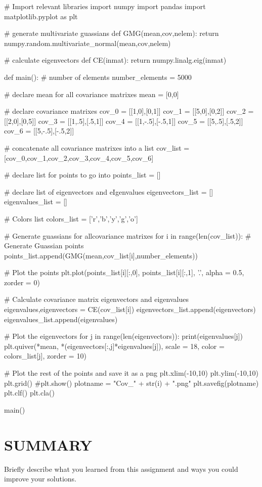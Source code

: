 \documentclass{article}
\begin{document}
\begin{python}
        # Import relevant libraries
        import numpy
        import pandas
        import matplotlib.pyplot as plt

        # generate multivariate guassians
        def GMG(mean,cov,nelem):
            return numpy.random.multivariate_normal(mean,cov,nelem)
        
        # calculate eigenvectors
        def CE(inmat):
            return numpy.linalg.eig(inmat)
        
        def main():
            # number of elements
            number_elements = 5000
        
           # declare mean for all covariance matrixes
            mean = [0,0]
        
            # declare covariance matrixes
            cov_0 = [[1,0],[0,1]]
            cov_1 = [[5,0],[0,2]]
            cov_2 = [[2,0],[0,5]]
            cov_3 = [[1,.5],[.5,1]]
            cov_4 = [[1,-.5],[-.5,1]]
            cov_5 = [[5,.5],[.5,2]]
            cov_6 = [[5,-.5],[-.5,2]]
        
            # concatenate all covariance matrixes into a list
            cov_list = [cov_0,cov_1,cov_2,cov_3,cov_4,cov_5,cov_6]
        
            # declare list for points to go into
            points_list = []
        
            # declare list of eigenvectors and eIgenvalues
            eigenvectors_list = []
            eigenvalues_list = []
        
            # Colors list
            colors_list = ['r','b','y','g','o']
        
            # Generate guassians for allcovariance matrixes
            for i in range(len(cov_list)):
                # Generate Guassian points
                points_list.append(GMG(mean,cov_list[i],number_elements))
                
                # Plot the points
                plt.plot(points_list[i][:,0], points_list[i][:,1], '.', alpha = 0.5, zorder = 0)
                
                # Calculate covariance matrix eigenvectors and eigenvalues
                eigenvalues,eigenvectors = CE(cov_list[i])
                eigenvectors_list.append(eigenvectors)
                eigenvalues_list.append(eigenvalues)
        
                # Plot the eigenvectors
                for j in range(len(eigenvectors)):
                    print(eigenvalues[j])     
                    plt.quiver(*mean, *(eigenvectors[:,j]*eigenvalues[j]), scale = 18, color = colors_list[j], zorder = 10)
                
                # Plot the rest of the points and save it as a png
                plt.xlim(-10,10)
                plt.ylim(-10,10)
                plt.grid()
                #plt.show()
                plotname = "Cov_" + str(i) + ".png"
                plt.savefig(plotname)
                plt.clf()
                plt.cla()
               
        main()

\end{python}
\section{SUMMARY}
\large{Briefly describe what you learned from this assignment and ways you could improve your solutions.}
\end{document}
